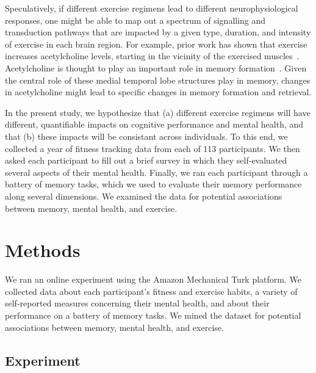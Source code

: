 \documentclass[10pt]{article}
\begin{document}
Speculatively, if different exercise regimens lead to different
neurophysiological responses, one might be able to map out a spectrum
of signalling and transduction pathways that are impacted by a given
type, duration, and intensity of exercise in each brain region.  For
example, prior work has shown that exercise increases acetylcholine
levels, starting in the vicinity of the exercised
muscles~\citep{ShoeEtal97}.  Acetylcholine is thought to play an
important role in memory formation~\citep[e.g., by modulating specific
synaptic inputs from entorhinal cortex to the hippocampus, albeit in
rodents;]{PalaEtal21}.  Given the central role of these medial
temporal lobe structures play in memory, changes in acetylcholine
might lead to specific changes in memory formation and retrieval.

In the present study, we hypothesize that (a) different exercise regimens will
have different, quantifiable impacts on cognitive performance and
mental health, and that (b) these impacts will be consistant across
individuals.  To this end, we collected a year of fitness tracking
data from each of 113 participants.  We then asked each participant to
fill out a brief survey in which they self-evaluated several aspects
of their mental health.  Finally, we ran each participant through a
battery of memory tasks, which we used to evaluate their memory
performance along several dimensions.  We examined the data for
potential associations between memory, mental health, and exercise.

 \section*{Methods}

    We ran an online experiment using the Amazon Mechanical Turk
    platform.  We collected data about each participant's fitness and
    exercise habits, a variety of self-reported measures concerning their
    mental health, and about their performance on a battery of memory
    tasks.  We mined the dataset for potential associations between
    memory, mental health, and exercise.

    
    
\subsection*{Experiment}
\end{document}

